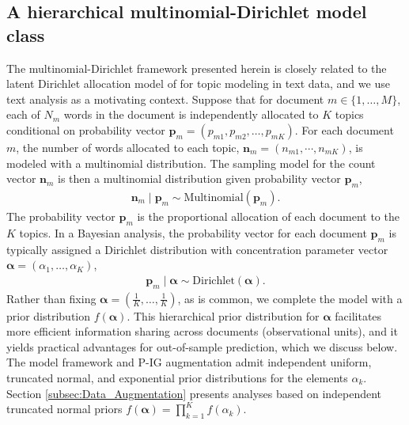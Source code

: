 \documentclass{statsoc}
\newcommand{\p}{\bm{p}}
\newcommand{\alphavec}{\bm{\alpha}}
\newcommand{\nn}{\bm{n}}
\begin{document}
\subsection{A hierarchical multinomial-Dirichlet model class}
\label{subsec:Model_Framework}
The multinomial-Dirichlet framework presented herein is closely related to the latent Dirichlet allocation model of \citet{blei2003latent} for topic modeling in text data, and we use text analysis as a motivating context.  Suppose that for document $m \in \{1, \ldots, M\}$, each of $N_m$ words in the document is independently allocated to $K$ topics conditional on probability vector $\p_m = \left(p_{m1}, p_{m2}, \ldots, p_{mK}\right)$.  For each document $m$, the number of words allocated to each topic, $\nn_m = \left(n_{m1}, \cdots, n_{mK}\right)$, is modeled with a multinomial distribution.  The sampling model for the count vector $\nn_m$ is then a multinomial distribution given probability vector $\p_m$,  
\begin{align}
    \nn_m \mid \p_m  \sim \text{Multinomial}\left(\p_m\right).
\end{align}
The probability vector $\p_m$ is the proportional allocation of each document to the $K$ topics.  In a Bayesian analysis, the probability vector for each document $\p_m$ is typically assigned a Dirichlet distribution with concentration parameter vector $\alphavec = \left(\alpha_1, \ldots, \alpha_K\right)$, 
\begin{align}
    \p_m \mid \alphavec \sim \text{Dirichlet}\left(\alphavec\right).
\end{align}
Rather than fixing $\alphavec = \left(\frac{1}{K}, \ldots, \frac{1}{K}\right)$, as is common, we complete the model with a prior distribution $f(\alphavec)$. This hierarchical prior distribution for $\alphavec$ facilitates more efficient information sharing across documents (observational units), and it yields practical advantages for out-of-sample prediction, which we discuss below.  The model framework and P-IG augmentation admit independent uniform, truncated normal, and exponential prior distributions for the elements $\alpha_k$.  Section \ref{subsec:Data_Augmentation} presents analyses based on independent truncated normal priors $f(\alphavec) = \prod_{k=1}^K f(\alpha_k)$.
\end{document}
